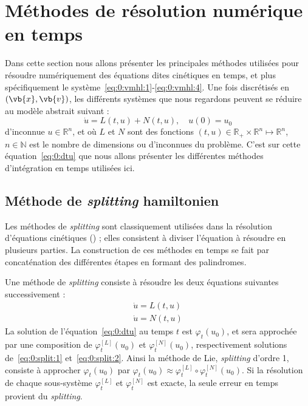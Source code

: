 
\section{Méthodes de résolution numérique en temps}

Dans cette section nous allons présenter les principales méthodes utilisées pour résoudre numériquement des équations dites cinétiques en temps, et plus spécifiquement le système~\eqref{eq:0:vmhl:1}-\eqref{eq:0:vmhl:4}. Une fois discrétisés en $(\vb{x},\vb{v})$, les différents systèmes que nous regardons peuvent se réduire au modèle abstrait suivant :
\begin{equation}
  \dot{u} = L(t,u) + N(t,u),\quad u(0)=u_0
  \label{eq:0:dtu}
\end{equation}
d'inconnue $u\in\mathbb{R}^n$, et où $L$ et $N$ sont des fonctions $(t,u)\in\mathbb{R}_+\times\mathbb{R}^n\mapsto\mathbb{R}^n$, $n\in\mathbb{N}$ est le nombre de dimensions ou d'inconnues du problème. C'est sur cette équation~\eqref{eq:0:dtu} que nous allons présenter les différentes méthodes d'intégration en temps utilisées ici.

\subsection{Méthode de \emph{splitting} hamiltonien}

Les méthodes de \emph{splitting} sont classiquement utilisées dans la résolution d'équations cinétiques (\cite{Morrison:2017,Grandgirard:2006,Tronci:2010,Tronci:2014}) ; elles consistent à diviser l'équation à résoudre en plusieurs parties. La construction de ces méthodes en temps se fait par concaténation des différentes étapes en formant des palindromes.

Une méthode de \emph{splitting} consiste à résoudre les deux équations suivantes successivement :
\begin{eqnarray}
    \dot{u} = L(t,u)\label{eq:0:split:1}\\
    \dot{u} = N(t,u)\label{eq:0:split:2}
\end{eqnarray}
La solution de l'équation~\eqref{eq:0:dtu} au temps $t$ est $\varphi_t(u_0)$, et sera approchée par une composition de $\varphi_t^{[L]}(u_0)$ et $\varphi_t^{[N]}(u_0)$, respectivement solutions de~\eqref{eq:0:split:1} et~\eqref{eq:0:split:2}. Ainsi la méthode de Lie, \emph{splitting} d'ordre 1, consiste à approcher $\varphi_t(u_0)$ par $\varphi_t(u_0)\approx \varphi_t^{[L]} \circ \varphi_t^{[N]}(u_0)$. Si la résolution de chaque sous-système $\varphi_t^{[L]}$ et $\varphi_t^{[N]}$ est exacte, la seule erreur en temps provient du \emph{splitting}.

